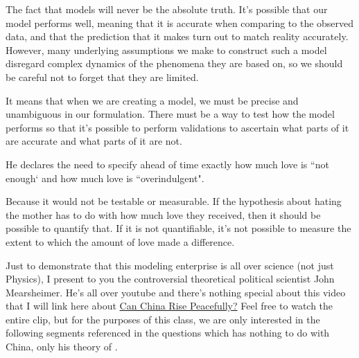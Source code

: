 \documentclass[12pt]{article}
\begin{document}
\begin{enumerate}
The fact that models will never be the absolute truth. It's possible that our model performs well,
meaning that it is accurate when comparing to the observed data, and that the prediction that
it makes turn out to match reality accurately. However, many underlying assumptions we make to
construct such a model disregard complex dynamics of the phenomena they are based on, so
we should be careful not to forget that they are limited.

 

It means that when we are creating a model, we must be precise and unambiguous in our formulation.
There must be a way to test how the model performs so that it's possible to perform validations
to ascertain what parts of it are accurate and what parts of it are not.

 

He declares the need to specify ahead of time exactly how much love is ``not enough` and how much love is
``overindulgent".

 

Because it would not be testable or measurable. If the hypothesis about hating the mother
has to do with how much love they received, then it should be possible to quantify that.
If it is not quantifiable, it's not possible to measure the extent to which the amount of love
made a difference.


Just to demonstrate that this modeling enterprise is all over science (not just Physics), I present to you the controversial theoretical political scientist John Mearsheimer. He's all over youtube and there's nothing special about this video that I will link here about \href{https://www.youtube.com/watch?v=D_Mx_e8t7nU&t=4673s}{Can China Rise Peacefully?} Feel free to watch the entire clip, but for the purposes of this class, we are only interested in the following segments referenced in the questions which has nothing to do with China, only his theory of .

 

 


\end{enumerate}
\end{document}
